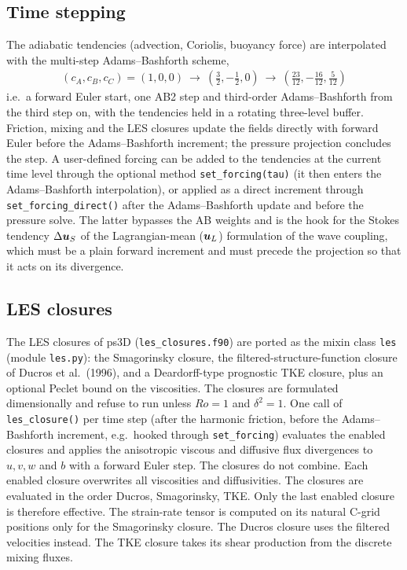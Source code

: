 \documentclass[12pt]{article}
\newcommand{\beq}  { \begin{eqnarray*} }
\newcommand{\eeq}  { \end{eqnarray*}}
\renewcommand{\v}[1]{{\mbox{\boldmath$ #1 $}}}  %
\newcommand{\lk}{\left(}
\newcommand{\rk}{\right)}
\begin{document}
\subsection*{Time stepping}

The adiabatic tendencies (advection, Coriolis, buoyancy force) are
interpolated with the multi-step Adams--Bashforth scheme,
\beq
(c_A, c_B, c_C) = (1,0,0) ~\to~ \lk \frac{3}{2}, -\frac{1}{2}, 0\rk
 ~\to~ \lk \frac{23}{12}, -\frac{16}{12}, \frac{5}{12} \rk
\eeq
i.e.\ a forward Euler start, one AB2 step and third-order Adams--Bashforth
from the third step on, with the tendencies held in a rotating three-level
buffer. Friction, mixing and the LES closures update the fields directly
with forward Euler before the Adams--Bashforth increment; the pressure
projection concludes the step. A user-defined forcing can be added to the
tendencies at the current time level through the optional method
\verb|set_forcing(tau)| (it then enters the Adams--Bashforth
interpolation), or applied as a direct increment through
\verb|set_forcing_direct()| after the Adams--Bashforth update and before
the pressure solve. The latter bypasses the AB weights and is the hook for
the Stokes tendency $\Delta \v u_S$ of the Lagrangian-mean ($\v u_L$)
formulation of the wave coupling, which must be a plain forward increment
and must precede the projection so that it acts on its divergence.

\subsection*{LES closures}

The LES closures of ps3D (\verb|les_closures.f90|) are ported as the mixin
class \verb|les| (module \verb|les.py|): the Smagorinsky closure, the
filtered-structure-function closure of Ducros et al.\ (1996), and a
Deardorff-type prognostic TKE closure, plus an optional Peclet bound on
the viscosities. The closures are formulated dimensionally and
refuse to run unless $Ro = 1$ and $\delta^2 = 1$. One call of
\verb|les_closure()| per time step (after the harmonic friction, before
the Adams--Bashforth increment, e.g.\ hooked through \verb|set_forcing|)
evaluates the enabled closures and applies the anisotropic viscous and
diffusive flux divergences to $u,v,w$ and $b$ with a forward Euler step.
The closures do not combine. Each enabled closure overwrites all
viscosities and diffusivities. The closures are evaluated in the order
Ducros, Smagorinsky, TKE. Only the last enabled closure is therefore
effective. The strain-rate tensor is computed on its natural C-grid
positions only for the Smagorinsky closure. The Ducros closure uses the
filtered velocities instead. The TKE closure takes its shear production
from the discrete mixing fluxes.
\end{document}
